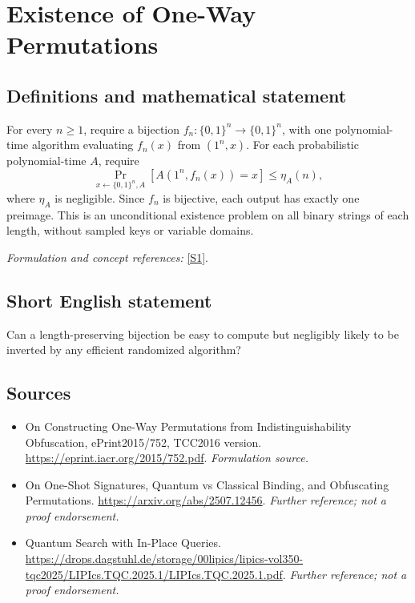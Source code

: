 \documentclass[11pt]{article}
\begin{document}
\section*{\texorpdfstring{Existence of One-Way Permutations}{Existence of One-Way Permutations}}\label{30006696}
\subsection{Definitions and mathematical statement}
For every $n\ge1$, require a bijection $f_n:\{0,1\}^n\to\{0,1\}^n$, with one polynomial-time algorithm evaluating $f_n(x)$ from $(1^n,x)$. For each probabilistic polynomial-time $A$, require
\[
 \Pr_{x\leftarrow\{0,1\}^n,A}[A(1^n,f_n(x))=x]\le\eta_A(n),
\]
where $\eta_A$ is negligible. Since $f_n$ is bijective, each output has exactly one preimage. This is an unconditional existence problem on all binary strings of each length, without sampled keys or variable domains.
\par\smallskip\textit{Formulation and concept references:} \href{https://eprint.iacr.org/2015/752.pdf}{[S1]}.

\subsection{Short English statement}
Can a length-preserving bijection be easy to compute but negligibly likely to be inverted by any efficient randomized algorithm?
\subsection{Sources}
\begin{itemize}
\item[S1]On Constructing One-Way Permutations from Indistinguishability Obfuscation, ePrint2015/752, TCC2016 version.
\url{https://eprint.iacr.org/2015/752.pdf}.
\textit{Formulation source.}
\item[S2]On One-Shot Signatures, Quantum vs Classical Binding, and Obfuscating Permutations.
\url{https://arxiv.org/abs/2507.12456}.
\textit{Further reference; not a proof endorsement.}
\item[S3]Quantum Search with In-Place Queries.
\url{https://drops.dagstuhl.de/storage/00lipics/lipics-vol350-tqc2025/LIPIcs.TQC.2025.1/LIPIcs.TQC.2025.1.pdf}.
\textit{Further reference; not a proof endorsement.}
\end{itemize}
\end{document}
